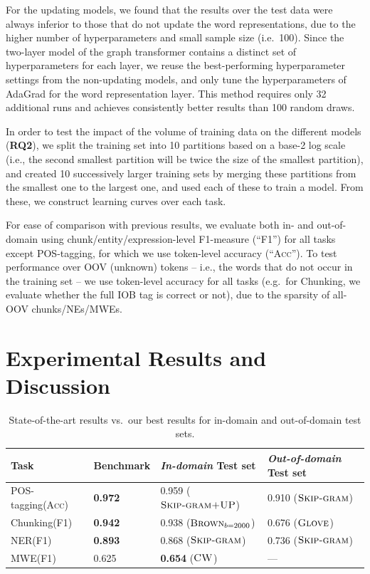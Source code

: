 \documentclass[11pt]{article}
\newcommand{\RQ}[1][1]{\textbf{RQ#1}\xspace}
\newcommand{\method}[2][]{\ensuremath{\textsc{#2#1}}\xspace}
\newcommand{\brown}[1][]{\method[\ensuremath{_{#1}}]{Brown}}
\newcommand{\CW}[1][]{\method[#1]{CW}}
\newcommand{\Skipgram}[1][]{\method[#1]{Skip-gram}}
\newcommand{\Glove}[1][]{\method[#1]{Glove}}
\newcommand{\withup}{\method{+UP}}
\newcommand{\task}[1]{\textsf{#1}\xspace}
\newcommand{\pos}{\task{POS-tagging}}
\newcommand{\chunking}{\task{Chunking}}
\newcommand{\ner}{\task{NER}}
\newcommand{\mwe}{\task{MWE}}
\newcommand{\evmeasure}[1]{\textsc{#1}\xspace}
\newcommand{\accuracy}{\evmeasure{Acc}}
\newcommand{\fscore}{\evmeasure{F1}}
\newcommand{\best}[1]{\textbf{#1}}
\begin{document}
For the updating models, we found that the results over the test data
were always inferior to those that do not update the word
representations, due to the higher number of hyperparameters and small
sample size (i.e.\ 100).
Since the two-layer model of the graph transformer contains a distinct
set of hyperparameters for each layer, we reuse the best-performing
hyperparameter settings from the non-updating models, and only tune the
hyperparameters of AdaGrad for the word representation layer. 
This method requires only 32 additional runs and achieves consistently
better results than 100 random draws.

In order to test the impact of the volume of training data on the
different models (\RQ[2]), we split the training set into 10 partitions based on
a base-2 log scale (i.e., the second smallest partition will be twice
the size of the smallest partition), and created 10 successively larger
training sets by merging these partitions from the smallest one to the
largest one, and used each of these to train a model.
From these, we construct learning curves over each task.

For ease of comparison with previous results, we evaluate both
in- and out-of-domain using 
chunk/entity/expression-level F1-measure (``\fscore'') for all tasks except \pos,
for which we use token-level accuracy (``\accuracy'').
To test performance over OOV (unknown) tokens -- i.e., the words that do
not occur in the training set -- we use token-level accuracy for all
tasks (e.g.\ for \chunking, we evaluate whether the full IOB tag is
correct or not), due to the sparsity of all-OOV chunks/NEs/MWEs.


\section{Experimental Results and Discussion}

\begin{table}[t]
\begin{center}
\begin{small}
\begin{tabular}{llll}
\hline
\textbf{Task}  & \textbf{Benchmark} & \textbf{\textit{In-domain} Test set} & \textbf{\textit{Out-of-domain} Test set} \\ \hline
\pos (\accuracy)    & \best{0.972} \cite{Toutanova:2003} & 0.959 (\Skipgram[\withup]) & 0.910 (\Skipgram)\\ 
\chunking (\fscore) & \best{0.942} \cite{Sha:2003} & 0.938 (\brown[b = 2000]) & 0.676 (\Glove)\\  
\ner (\fscore)      & \best{0.893} \cite{Ando:2005} & 0.868 (\Skipgram) & 0.736 (\Skipgram) \\  
\mwe (\fscore)      &0.625 \cite{Schneider+:2014} & \best{0.654} (\CW) & --- \\ %
\hline
\end{tabular}
\caption{State-of-the-art results vs.\ our best results for in-domain and
  out-of-domain test sets.}
\label{benchmark}
\end{small}
\end{center}
\end{table}
\end{document}
